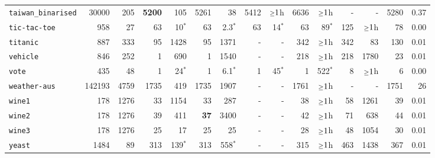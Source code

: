 \begin{tabular}{lccrrrrrrrrrrrr}
\texttt{taiwan\_binarised} & \multicolumn{1}{r}{30000} & \multicolumn{1}{r}{205}  & \textbf{5200} & 105 & 5261 & 38 & 5412 & $\mathsmaller{\geq}1$h & 6636 & $\mathsmaller{\geq}1$h & - & - & 5280 & 0.37\\
\texttt{tic-tac-toe} & \multicolumn{1}{r}{958} & \multicolumn{1}{r}{27}  & 63 & 10$^*$ & 63 & 2.3$^*$ & 63 & 14$^*$ & 63 & 89$^*$ & 125 & $\mathsmaller{\geq}1$h & 78 & 0.00\\
\texttt{titanic} & \multicolumn{1}{r}{887} & \multicolumn{1}{r}{333}  & 95 & 1428 & 95 & 1371 & - & - & 342 & $\mathsmaller{\geq}1$h & 342 & 83 & 130 & 0.01\\
\texttt{vehicle} & \multicolumn{1}{r}{846} & \multicolumn{1}{r}{252}  & 1 & 690 & 1 & 1540 & - & - & 218 & $\mathsmaller{\geq}1$h & 218 & 1780 & 23 & 0.01\\
\texttt{vote} & \multicolumn{1}{r}{435} & \multicolumn{1}{r}{48}  & 1 & 24$^*$ & 1 & 6.1$^*$ & 1 & 45$^*$ & 1 & 522$^*$ & 8 & $\mathsmaller{\geq}1$h & 6 & 0.00\\
\texttt{weather-aus} & \multicolumn{1}{r}{142193} & \multicolumn{1}{r}{4759}  & 1735 & 419 & 1735 & 1907 & - & - & 1761 & $\mathsmaller{\geq}1$h & - & - & 1751 & 26\\
\texttt{wine1} & \multicolumn{1}{r}{178} & \multicolumn{1}{r}{1276}  & 33 & 1154 & 33 & 287 & - & - & 38 & $\mathsmaller{\geq}1$h & 58 & 1261 & 39 & 0.01\\
\texttt{wine2} & \multicolumn{1}{r}{178} & \multicolumn{1}{r}{1276}  & 39 & 411 & \textbf{37} & 3400 & - & - & 42 & $\mathsmaller{\geq}1$h & 71 & 638 & 44 & 0.01\\
\texttt{wine3} & \multicolumn{1}{r}{178} & \multicolumn{1}{r}{1276}  & 25 & 17 & 25 & 25 & - & - & 28 & $\mathsmaller{\geq}1$h & 48 & 1054 & 30 & 0.01\\
\texttt{yeast} & \multicolumn{1}{r}{1484} & \multicolumn{1}{r}{89}  & 313 & 139$^*$ & 313 & 558$^*$ & - & - & 315 & $\mathsmaller{\geq}1$h & 463 & 1438 & 367 & 0.01\\
\bottomrule
\end{tabular}
